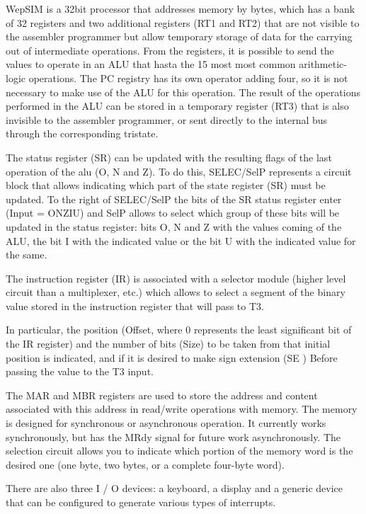 WepSIM is a 32bit processor that addresses memory by bytes, which has a bank of 32 registers and two additional registers (RT1 and RT2) that are not visible to the assembler programmer but allow temporary storage of data for the carrying out of intermediate operations. From the registers, it is possible to send the values to operate in an ALU that hasta the 15 most most common arithmetic-logic operations.  The PC registry has its own operator adding four, so it is not necessary to make use of the ALU for this operation. The result of the operations performed in the ALU can be stored in a temporary register (RT3) that is also invisible to the assembler programmer, or sent directly to the internal bus through the corresponding tristate.


The status register (SR) can be updated with the resulting flags of the last operation of the alu (O, N and Z). To do this, SELEC/SelP represents a circuit block that allows indicating which part of the state register (SR) must be updated. To the right of SELEC/SelP the bits of the SR status register enter (Input = ONZIU) and SelP allows to select which group of these bits will be updated in the status register: bits O, N and Z with the values coming of the ALU, the bit I with the indicated value or the bit U with the indicated value for the same.

The instruction register (IR) is associated with a selector module (higher level circuit than a multiplexer, etc.) which allows to select a segment of the binary value stored in the instruction register that will pass to T3.

In particular, the position (Offset, where 0 represents the least significant bit of the IR register) and the number of bits (Size) to be taken from that initial position is indicated, and if it is desired to make sign extension (SE ) Before passing the value to the T3 input.

The MAR and MBR registers are used to store the address and content associated with this address in read/write operations with memory. The memory is designed for synchronous or asynchronous operation. It currently works synchronously, but has the MRdy signal for future work asynchronously. The selection circuit allows you to indicate which portion of the memory word is the desired one (one byte, two bytes, or a complete four-byte word).

There are also three I / O devices: a keyboard, a display and a generic device that can be configured to generate various types of interrupts.

